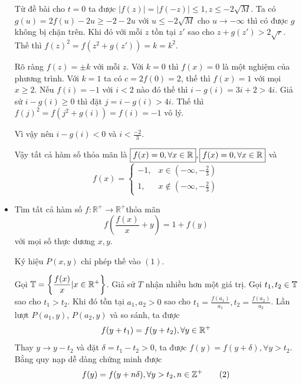 \documentclass[11pt]{scrartcl}
\begin{document}
\begin{itemize}[label=, leftmargin=0em, itemsep=0.5em]
\begin{sol}
        Từ đề bài cho $t = 0$ ta được $|f(z)| = |f(-z)| \leq 1, z \leq -2\sqrt{M}$. Ta có $g(u) = 2f(u) - 2u \geq - 2-2u$ với $u \leq -2\sqrt{M}$ cho $u \to -\infty$ thì có được $g$ không bị chặn trên. Khi đó với mỗi $z$ tồn tại $z'$ sao cho $z + g(z') > 2\sqrt{r}$. Thế thì $f(z)^2 = f(z^2 + g(z')) = k = k^2$. 
        
        Rõ ràng $f(z) = \pm k$ với mỗi $z$. Với $k = 0$ thì $f(x) = 0$ là một nghiệm của phương trình. Với $k = 1$ ta có $c = 2f(0) = 2$, thế thì $f(x) = 1$ với mọi $x \geq 2$. Nếu $f(i) = - 1$ với $i < 2$ nào đó thế thì $i - g(i) = 3i + 2> 4i$. Giả sử $i - g(i) \geq 0$ thì đặt $j = i -g(i) > 4i$. Thế thì $f(j)^2 = f(j^2 + g(i)) = f(i) = -1$ vô lý. 
        
        Vì vậy nên $i - g(i) < 0$ và $i < \frac{-2}{3}$. 
        
        Vậy tất cả hàm số thỏa mãn là $\boxed{f(x) = 0 ,\forall x\in \mathbb{R}}, \boxed{f(x) = 0 ,\forall x\in \mathbb{R}}$ và 
        \[\boxed{ f(x)=
        \left\{\begin{array}{rr}-1,&x\in \left(-\infty,-\frac{2}{3}\right)\\
            1,&x\not\in \left(-\infty,-\frac{2}{3}\right)
        \end{array}
        \right.
        }
        \]
    \end{sol}

    \item \begin{bt}
        Tìm tất cả hàm số $f: \mathbb{R}^{+} \rightarrow \mathbb{R}^{+}$thỏa mãn
        \[
        f\left(\frac{f(x)}{x}+y\right)=1+f(y) \tag{1}
        \]
        với mọi số thực dương $x, y$.
    \end{bt}
    
    \begin{sol}
        Ký hiệu $P(x,y)$ chỉ phép thế vào $(1)$.


        Gọi $\bb{T} =\left\{\frac{f(x)}{x}| x \in \bb{R^+}\right\}$. Giả sử $T$ nhận nhiều hơn một giá trị. Gọi $t_1, t_2 \in \mathbb{T}$ sao cho $t_1 > t_2$. Khi đó tồn tại $a_1,a_2 > 0$ sao cho $t_1 = \frac{f(a_1)}{a_1}, t_2 = \frac{f(a_2)}{a_2}$. Lần lượt $P(a_1,y)$, $P(a_2,y)$ và so sánh, ta được 
        \[
            f(y + t_1) = f(y + t_2), \forall y\in \mathbb{R^+}
        \]
        Thay $y \to y - t_2$ và đặt $\delta = t_1 - t_2 > 0$, ta được $f(y) = f(y + \delta), \forall y > t_2$. Bằng quy nạp dễ dàng chứng minh được 
        \[f(y) = f(y + n\delta),\forall y > t_2, n \in \mathbb{Z^+} \tag{2}\]
        

\end{sol}
\end{itemize}
\end{document}
